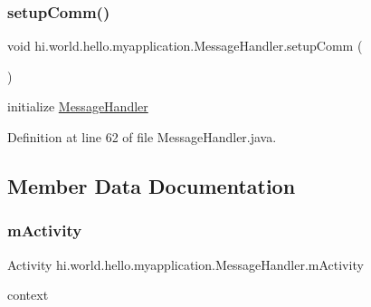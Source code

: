 \subsubsection{\texorpdfstring{setupComm()}{setupComm()}}
{\footnotesize\ttfamily void hi.\+world.\+hello.\+myapplication.\+Message\+Handler.\+setup\+Comm (\begin{DoxyParamCaption}{ }\end{DoxyParamCaption})\hspace{0.3cm}{\ttfamily [private]}}



initialize \mbox{\hyperlink{classhi_1_1world_1_1hello_1_1myapplication_1_1_message_handler}{Message\+Handler}} 



Definition at line 62 of file Message\+Handler.\+java.


\begin{DoxyCode}{0}

\end{DoxyCode}


\subsection{Member Data Documentation}
\mbox{\label{classhi_1_1world_1_1hello_1_1myapplication_1_1_message_handler_aea04de3c9ae7a2a0946c7c039a42d2d5}} 
\subsubsection{\texorpdfstring{mActivity}{mActivity}}
{\footnotesize\ttfamily Activity hi.\+world.\+hello.\+myapplication.\+Message\+Handler.\+m\+Activity\hspace{0.3cm}{\ttfamily [private]}}



context 



